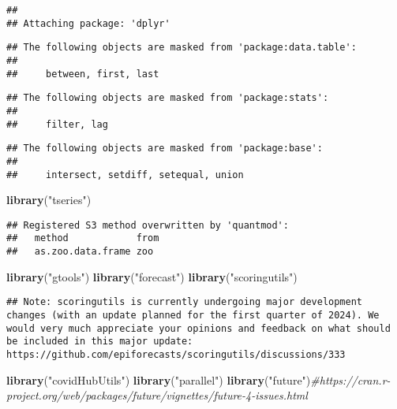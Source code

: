 \documentclass[
]{article}
\newenvironment{Shaded}{\begin{snugshade}}{\end{snugshade}}
\newcommand{\CommentTok}[1]{\textcolor[rgb]{0.56,0.35,0.01}{\textit{#1}}}
\newcommand{\FunctionTok}[1]{\textcolor[rgb]{0.13,0.29,0.53}{\textbf{#1}}}
\newcommand{\NormalTok}[1]{#1}
\newcommand{\StringTok}[1]{\textcolor[rgb]{0.31,0.60,0.02}{#1}}
\begin{document}
\begin{verbatim}
## 
## Attaching package: 'dplyr'
\end{verbatim}

\begin{verbatim}
## The following objects are masked from 'package:data.table':
## 
##     between, first, last
\end{verbatim}

\begin{verbatim}
## The following objects are masked from 'package:stats':
## 
##     filter, lag
\end{verbatim}

\begin{verbatim}
## The following objects are masked from 'package:base':
## 
##     intersect, setdiff, setequal, union
\end{verbatim}

\begin{Shaded}
\begin{Highlighting}[]
\FunctionTok{library}\NormalTok{(}\StringTok{"tseries"}\NormalTok{)}
\end{Highlighting}
\end{Shaded}

\begin{verbatim}
## Registered S3 method overwritten by 'quantmod':
##   method            from
##   as.zoo.data.frame zoo
\end{verbatim}

\begin{Shaded}
\begin{Highlighting}[]
\FunctionTok{library}\NormalTok{(}\StringTok{"gtools"}\NormalTok{)}
\FunctionTok{library}\NormalTok{(}\StringTok{"forecast"}\NormalTok{)}
\FunctionTok{library}\NormalTok{(}\StringTok{"scoringutils"}\NormalTok{)}
\end{Highlighting}
\end{Shaded}

\begin{verbatim}
## Note: scoringutils is currently undergoing major development changes (with an update planned for the first quarter of 2024). We would very much appreciate your opinions and feedback on what should be included in this major update: https://github.com/epiforecasts/scoringutils/discussions/333
\end{verbatim}

\begin{Shaded}
\begin{Highlighting}[]
\FunctionTok{library}\NormalTok{(}\StringTok{"covidHubUtils"}\NormalTok{)}
\FunctionTok{library}\NormalTok{(}\StringTok{"parallel"}\NormalTok{)}
\FunctionTok{library}\NormalTok{(}\StringTok{"future"}\NormalTok{)}\CommentTok{\#https://cran.r{-}project.org/web/packages/future/vignettes/future{-}4{-}issues.html}
\end{Highlighting}
\end{Shaded}
\end{document}
